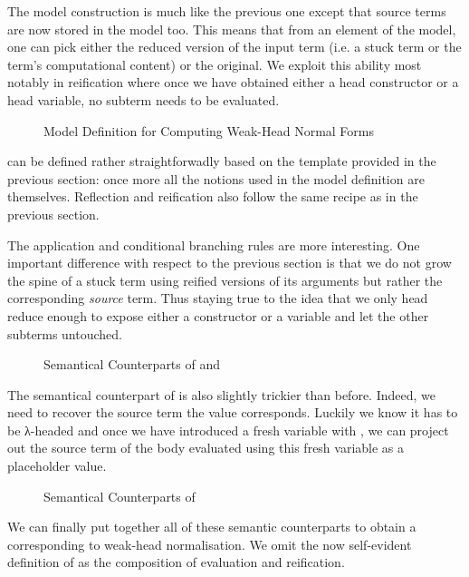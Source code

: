 The model construction is much like the previous one except
that source terms are now stored in the model too. This means that
from an element of the model, one can pick either the reduced version
of the input term (i.e. a stuck term or the term's computational
content) or the original. We exploit this ability most
notably in reification where once we have obtained either a
head constructor or a head variable, no subterm needs to
be evaluated.

\begin{figure}[h]
\caption{Model Definition for Computing Weak-Head Normal Forms\label{fig:betaiotamodel}}
\end{figure}

 can be defined rather straightforwadly based on the template provided
in the previous section: once more all the notions used in the model definition
are  themselves. Reflection and reification also follow the same recipe
as in the previous section.


The application and conditional branching rules are more
interesting. One important difference with respect to the previous
section is that we do not grow the spine of a stuck term using
reified versions of its arguments but rather the corresponding
\emph{source} term. Thus staying true to the idea that we only head
reduce enough to expose either a constructor or a variable and let
the other subterms untouched.

\begin{figure}[h]
\caption{Semantical Counterparts of  and \label{fig:betaiotaappifte}}
\end{figure}

The semantical counterpart of  is also slightly trickier than before. Indeed, we
need to recover the source term the value corresponds. Luckily we know it has to be
λ-headed and once we have introduced a fresh variable with , we can project
out the source term of the body evaluated using this fresh variable as a placeholder
value.

\begin{figure}[h]
\caption{Semantical Counterparts of \label{fig:betaiotalam}}
\end{figure}

We can finally put together all of these semantic counterparts to
obtain a  corresponding to weak-head normalisation.
We omit the now self-evident definition of  as the
composition of evaluation and reification.

